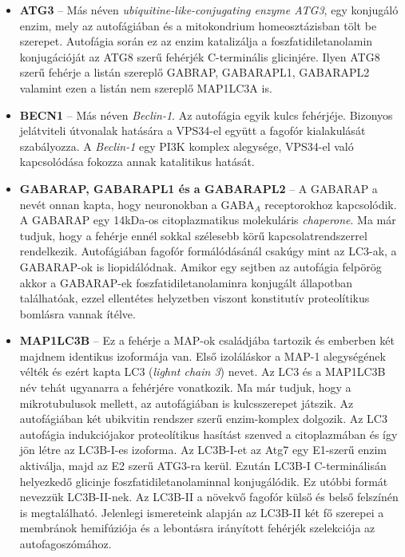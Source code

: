 \documentclass[a4paper,12pt]{article}
\begin{document}
				\begin{itemize}
					\item \textbf{ATG3} -- Más néven \textit{ubiquitine-like-conjugating enzyme ATG3}, egy konjugáló enzim, mely az autofágiában és a mitokondrium homeosztázisban tölt be szerepet. Autofágia során ez az enzim katalizálja a foszfatidiletanolamin konjugációját az ATG8 szerű fehérjék C-terminális glicinjére. Ilyen ATG8 szerű fehérje a listán szereplő GABRAP, GABARAPL1, GABARAPL2 valamint ezen a listán nem szereplő MAP1LC3A is. \cite{autophagy_proteins}

					\item \textbf{BECN1} -- Más néven \textit{Beclin-1}. Az autofágia egyik kulcs fehérjéje. Bizonyos jelátviteli útvonalak hatására a VPS34-el együtt a fagofór kialakulását szabályozza. A \textit{Beclin-1} egy PI3K komplex alegysége, VPS34-el való kapcsolódása fokozza annak katalitikus hatását. \cite{autophagy_proteins}
					
					\item \textbf{GABARAP, GABARAPL1 és a GABARAPL2} -- A GABARAP a nevét onnan kapta, hogy neuronokban a GABA$_A$ receptorokhoz kapcsolódik. A GABARAP egy 14kDa-os citoplazmatikus molekuláris \textit{chaperone}. Ma már tudjuk, hogy a fehérje ennél sokkal szélesebb körű kapcsolatrendszerrel rendelkezik. Autofágiában fagofór formálódásánál csakúgy mint az LC3-ak, a GABARAP-ok is liopidálódnak. Amikor egy sejtben az autofágia felpörög akkor a GABARAP-ek foszfatidiletanolaminra konjugált állapotban találhatóak, ezzel ellentétes helyzetben viszont konstitutív proteolítikus bomlásra vannak ítélve. \cite{atg8_like}

					\item \textbf{MAP1LC3B} -- Ez a fehérje a MAP-ok családjába tartozik és emberben két majdnem identikus izoformája van. Első izoláláskor a MAP-1 alegységének vélték és ezért kapta LC3 (\textit{lighnt chain 3}) nevet. Az LC3 és a MAP1LC3B név tehát ugyanarra a fehérjére vonatkozik. Ma már tudjuk, hogy a mikrotubulusok mellett, az autofágiában is kulcsszerepet játszik. \cite{atg8_like} Az autofágiában két ubikvitin rendszer szerű enzim-komplex dolgozik. Az LC3 autofágia indukciójakor proteolítikus hasítást szenved a citoplazmában és így jön létre az LC3B-I-es izoforma. Az LC3B-I-et az Atg7 egy E1-szerű enzim aktiválja, majd az E2 szerű ATG3-ra kerül. Ezután LC3B-I C-terminálisán helyezkedő glicinje foszfatidiletanolaminnal konjugálódik. Ez utóbbi formát nevezzük LC3B-II-nek. Az LC3B-II a növekvő fagofór külső és belső felszínén is megtalálható. Jelenlegi ismereteink alapján az LC3B-II két fő szerepei a membránok hemifúziója és a lebontásra irányított fehérjék szelekciója az autofagoszómához. \cite{autophagy_proteins}
					

\end{itemize}
\end{document}
